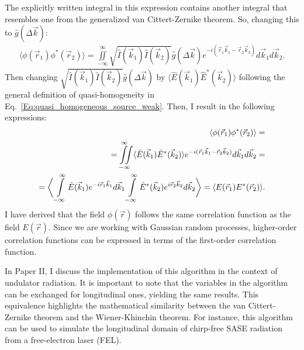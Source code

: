     The explicitly written integral in this expression contains another integral that resembles one from the generalized van Cittert-Zernike theorem. So, changing this to $\hat{g}(\Delta \vec{k})$:
    \begin{align}
        \langle \phi(\vec{r}_1) \phi^*(\vec{r}_2) \rangle =  
        \iint \limits_{-\infty}^{\infty}  \sqrt{\hat{I}(\vec{k}_1)\hat{I}(\vec{k}_2)}\hat{g}(\Delta \vec{k}) e^{-i (\vec{r}_1\vec{k}_1 - \vec{r}_2\vec{k}_2)} d\vec{k}_1 d\vec{k}_2.
    \end{align}
    Then changing $\sqrt{\hat{I}(\vec{k}_1)\hat{I}(\vec{k}_2)}\hat{g}(\Delta \vec{k})$ by $\langle \hat{E}(\vec{k}_1) \hat{E}^{*}(\vec{k}_2) \rangle$ following the general definition of quasi-homogeneity in Eq.~\ref{Eq:quasi_homogeneous_source_weak}. Then, I result in the following expressions:
    \begin{align}
        \langle \phi(\vec{r}_1) \phi^*(\vec{r}_2) \rangle = \cr 
        = \iint \limits_{-\infty}^{\infty} \langle \hat{E}(\vec{k}_1) \hat{E}^{*}(\vec{k}_2) \rangle  e^{-i (\vec{r}_1\vec{k}_1 - \vec{r}_2\vec{k}_2)} d\vec{k}_1 d\vec{k}_2 = \cr
        = \bigg\langle \int \limits_{-\infty}^{\infty} \hat{E}(\vec{k}_1) e^{-i \vec{r}_1\vec{k}_1} d\vec{k}_1 \int \limits_{-\infty}^{\infty} \hat{E}^{*}(\vec{k}_2) e^{i \vec{r}_2\vec{k}_2} d\vec{k}_2 \bigg\rangle = \langle E(\vec{r}_1)E^{*}(\vec{r}_2) \rangle.
    \end{align}
    I have derived that the field $\phi(\vec{r})$ follows the same correlation function as the field $E(\vec{r})$. Since we are working with Gaussian random processes, higher-order correlation functions can be expressed in terms of the first-order correlation function.

    
    In Paper II, I discuss the implementation of this algorithm in the context of undulator radiation. It is important to note that the variables in the algorithm can be exchanged for longitudinal ones, yielding the same results. This equivalence highlights the mathematical similarity between the van Cittert-Zernike theorem and the Wiener-Khinchin theorem. For instance, this algorithm can be used to simulate the longitudinal domain of chirp-free SASE radiation from a free-electron laser (FEL).

    
\newpage    
\setcounter{mycounter}{2} %
